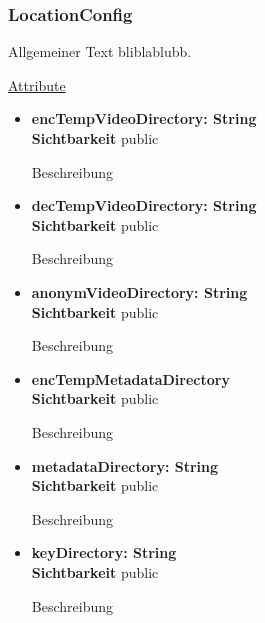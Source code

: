 \subsubsection{LocationConfig}
Allgemeiner Text bliblablubb. \newline

\underline{Attribute}
\begin{itemize}
\itemsep0pt
\item \textbf{encTempVideoDirectory: String} \hfill\\ 
\textbf{Sichtbarkeit} public

Beschreibung

\item \textbf{decTempVideoDirectory: String} \hfill\\ 
\textbf{Sichtbarkeit} public
 
Beschreibung

\item \textbf{anonymVideoDirectory: String} \hfill\\ 
\textbf{Sichtbarkeit} public

Beschreibung

\item \textbf{encTempMetadataDirectory} \hfill\\ 
\textbf{Sichtbarkeit} public

Beschreibung

\item \textbf{metadataDirectory: String} \hfill\\ 
\textbf{Sichtbarkeit} public

Beschreibung

\item \textbf{keyDirectory: String} \hfill\\ 
\textbf{Sichtbarkeit} public

Beschreibung
\end{itemize}